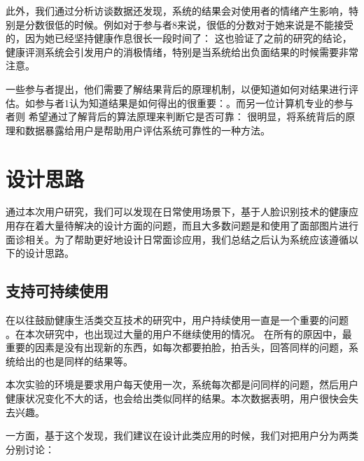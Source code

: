 此外，我们通过分析访谈数据还发现，系统的结果会对使用者的情绪产生影响，特别是分数很低的时候。例如对于参与者8来说，很低的分数对于她来说是不能接受的，因为她已经坚持健康作息很长一段时间了： 这也验证了之前的研究\cite{Toscos2013Designing}的结论，健康评测系统会引发用户的消极情绪，特别是当系统给出负面结果的时候需要非常注意。

一些参与者提出，他们需要了解结果背后的原理机制，以便知道如何对结果进行评估。如参与者1认为知道结果是如何得出的很重要：。而另一位计算机专业的参与者则
希望通过了解背后的算法原理来判断它是否可靠： 很明显，将系统背后的原理和数据暴露给用户是帮助用户评估系统可靠性的一种方法。

\section{设计思路}

通过本次用户研究，我们可以发现在日常使用场景下，基于人脸识别技术的健康应用存在着大量待解决的设计方面的问题，而且大多数问题是和使用了面部图片进行面诊相关。为了帮助更好地设计日常面诊应用，我们总结之后认为系统应该遵循以下的设计思路。

\subsection{支持可持续使用}
在以往鼓励健康生活类交互技术的研究中，用户持续使用一直是一个重要的问题\cite{Clawson2015No} \cite{Epstein2016Beyond}。在本次研究中，也出现过大量的用户不继续使用的情况。
在所有的原因中，最重要的因素是没有出现新的东西，如每次都要拍脸，拍舌头，回答同样的问题，系统给出的也是同样的结果等。

本次实验的环境是要求用户每天使用一次，系统每次都是问同样的问题，然后用户健康状况变化不大的话，也会给出类似同样的结果。本次数据表明，用户很快会失去兴趣。

一方面，基于这个发现，我们建议在设计此类应用的时候，我们对把用户分为两类分别讨论：

